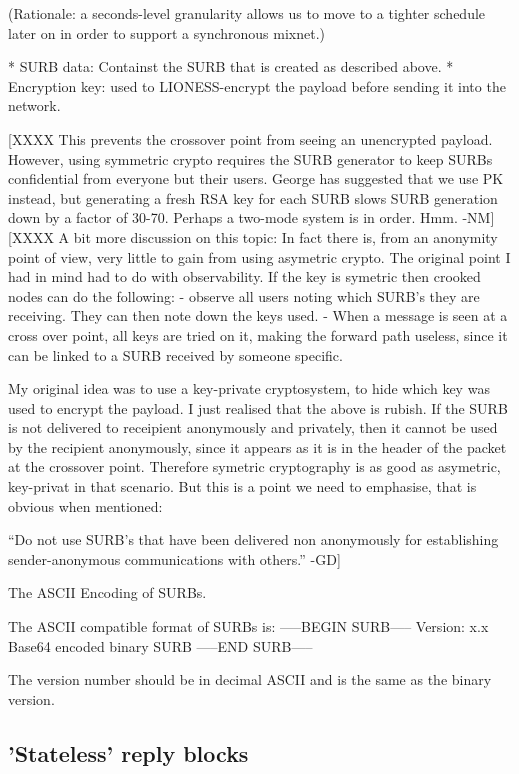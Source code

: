   (Rationale: a seconds-level granularity allows us to move to a
  tighter schedule later on in order to support a synchronous mixnet.)

* SURB data: Containst the SURB that is created as described
  above. 
* Encryption key: used to LIONESS-encrypt the payload before sending it
  into the network.  

  [XXXX This prevents the crossover point from seeing an
    unencrypted payload.  However, using symmetric crypto requires the
    SURB generator to keep SURBs confidential from everyone but their
    users.  George has suggested that we use PK instead, but generating
    a fresh RSA key for each SURB slows SURB generation down by a factor
    of 30-70.   Perhaps a two-mode system is in order.  Hmm. -NM]
  [XXXX A bit more discussion on this topic: In fact there is, from an
    anonymity point of view, very little to gain from using asymetric
    crypto. The original point I had in mind had to do with
    observability. If the key is symetric then crooked nodes can do
    the following:
	- observe all users noting which SURB's they are receiving.
	  They can then note down the keys used.
	- When a message is seen at a cross over point, all keys are
    	  tried on it, making the forward path useless, since it can
          be linked to a SURB received by someone specific.

    My original idea was to use a key-private cryptosystem, to hide
    which key was used to encrypt the payload.
    I just realised that the above is rubish. If the SURB is not
    delivered to receipient anonymously and privately, then it cannot
    be used by the recipient anonymously, since it appears as it is in
    the header of the packet at the crossover point. Therefore
    symetric cryptography is as good as asymetric, key-privat in that
    scenario. But this is a point we need to emphasise, that is
    obvious when mentioned:

	``Do not use SURB's that have been delivered non anonymously
	for establishing sender-anonymous communications with others.''
								-GD]

The ASCII Encoding of SURBs.

The  ASCII compatible format of SURBs is:
-----BEGIN SURB-----
Version: x.x
Base64 encoded binary SURB 
-----END SURB-----

The version number should be in decimal ASCII and is the same as the
binary version.

\subsection{'Stateless' reply blocks}

